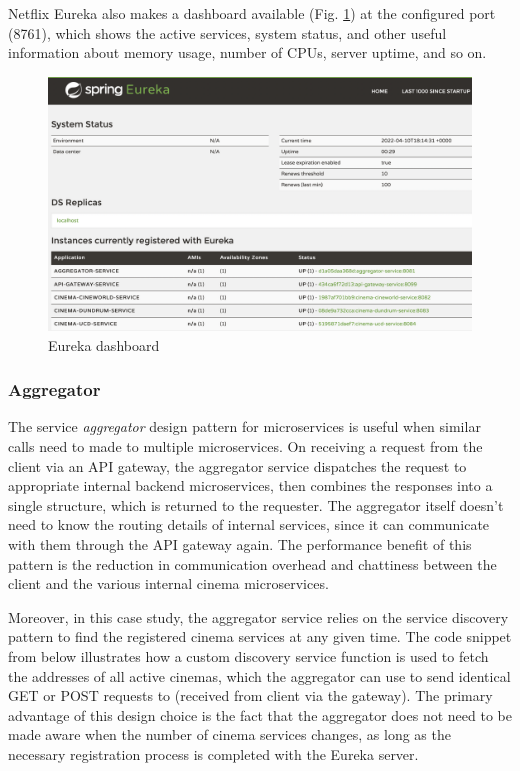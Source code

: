 Netflix Eureka also makes a dashboard available (Fig. \ref{fig:eureka-dashboard}) at the configured port (8761), which shows the active services, system status, and other useful information about memory usage, number of CPUs, server uptime, and so on.

\begin{figure}[H]
  \centering
  \includegraphics[width=1.0\linewidth]{./assets/images/case-studies/eureka-dashboard.png}
  \caption{Eureka dashboard}
  \label{fig:eureka-dashboard}
\end{figure}

\subsubsection{Aggregator}

The service \textit{aggregator} design pattern for microservices is useful when similar calls need to made to multiple microservices. On receiving a request from the client via an API gateway, the aggregator service dispatches the request to appropriate internal backend microservices, then combines the responses into a single structure, which is returned to the requester. The aggregator itself doesn't need to know the routing details of internal services, since it can communicate with them through the API gateway again. The performance benefit of this pattern is the reduction in communication overhead and chattiness between the client and the various internal cinema microservices.

Moreover, in this case study, the aggregator service relies on the service discovery pattern to find the registered cinema services at any given time. The code snippet from  below illustrates how a custom discovery service function is used to fetch the addresses of all active cinemas, which the aggregator can use to send identical GET or POST requests to (received from client via the gateway). The primary advantage of this design choice is the fact that the aggregator does not need to be made aware when the number of cinema services changes, as long as the necessary registration process is completed with the Eureka server.

